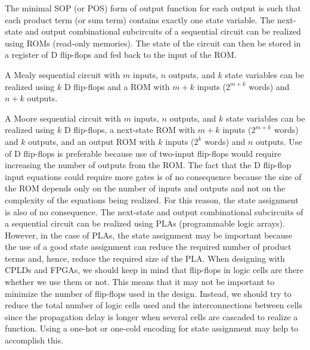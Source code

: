 \documentclass[a4paper,12pt]{report}
\begin{document}
\item The minimal SOP (or POS) form of output function for each output is such that each product term (or sum term) contains exactly one state variable.
\eit
{}
The next-state and output combinational subcircuits of a sequential circuit can be realized using ROMs (read-only memories). The state of the circuit can then be stored in a register of D flip-flops and fed back to the input of the ROM.
\bit
\item A Mealy sequential circuit with $m$ inputs, $n$ outputs, and $k$ state variables can be realized using $k$ D flip-flops and a ROM with $m + k$ inputs ($2^{m+k}$ words) and $n + k$ outputs.
\item A Moore sequential circuit with $m$ inputs, $n$ outputs, and $k$ state variables can be realized using $k$ D flip-flops, a next-state ROM with $m + k$ inputs ($2^{m+k}$ words) and $k$ outputs, and an output ROM with $k$ inputs ($2^k$ words) and $n$ outputs.
\eit
Use of D flip-flops is preferable because use of two-input flip-flops would require increasing the number of outputs from the ROM. The fact that the D flip-flop input equations could require more gates is of no consequence because the size of the ROM depends only on the number of inputs and outputs and not on the complexity of the equations being realized. For this reason, the state assignment is also of no consequence.
The next-state and output combinational subcircuits of a sequential circuit can be realized using PLAs (programmable logic arrays). However, in the case of PLAs, the state assignment may be important because the use of a good state assignment can reduce the required number of product terms and, hence, reduce the required size of the PLA.
When designing with CPLDs and FPGAs, we should keep in mind that flip-flops in logic cells are there whether we use them or not. This means that it may not be important to minimize the number of flip-flops used in the design. Instead, we should try to reduce the total number of logic cells used and the interconnections between cells since the propagation delay is longer when several cells are cascaded to realize a function. Using a one-hot or one-cold encoding for state assignment may help to accomplish this.
\end{document}
